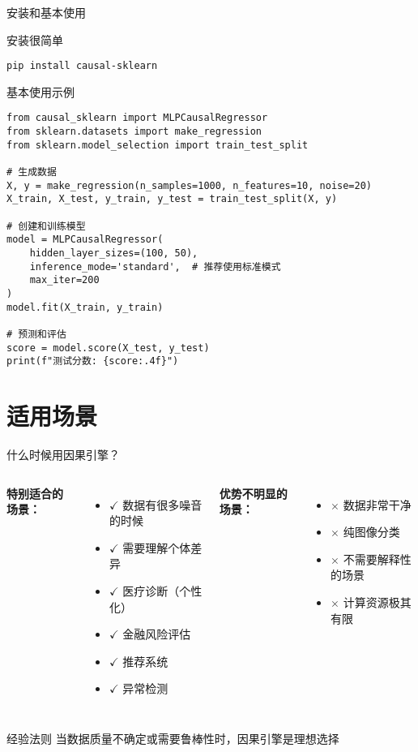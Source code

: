 \documentclass[aspectratio=169,12pt]{beamer}
\begin{document}
\begin{frame}[fragile]{安装和基本使用}
\begin{block}{安装很简单}
\begin{lstlisting}
pip install causal-sklearn
\end{lstlisting}
\end{block}

\begin{block}{基本使用示例}
\begin{lstlisting}
from causal_sklearn import MLPCausalRegressor
from sklearn.datasets import make_regression
from sklearn.model_selection import train_test_split

# 生成数据
X, y = make_regression(n_samples=1000, n_features=10, noise=20)
X_train, X_test, y_train, y_test = train_test_split(X, y)

# 创建和训练模型
model = MLPCausalRegressor(
    hidden_layer_sizes=(100, 50),
    inference_mode='standard',  # 推荐使用标准模式
    max_iter=200
)
model.fit(X_train, y_train)

# 预测和评估
score = model.score(X_test, y_test)
print(f"测试分数: {score:.4f}")
\end{lstlisting}
\end{block}
\end{frame}

\section{适用场景}

\begin{frame}{什么时候用因果引擎？}
\begin{columns}
\textbf{特别适合的场景：}
\begin{itemize}
    \item $\checkmark$ 数据有很多噪音的时候
    \item $\checkmark$ 需要理解个体差异
    \item $\checkmark$ 医疗诊断（个性化）
    \item $\checkmark$ 金融风险评估
    \item $\checkmark$ 推荐系统
    \item $\checkmark$ 异常检测
\end{itemize}

\textbf{优势不明显的场景：}
\begin{itemize}
    \item $\times$ 数据非常干净
    \item $\times$ 纯图像分类
    \item $\times$ 不需要解释性的场景
    \item $\times$ 计算资源极其有限
\end{itemize}
\end{columns}

\vspace{1em}
\begin{block}{经验法则}
当数据质量不确定或需要鲁棒性时，因果引擎是理想选择
\end{block}
\end{frame}
\end{document}

